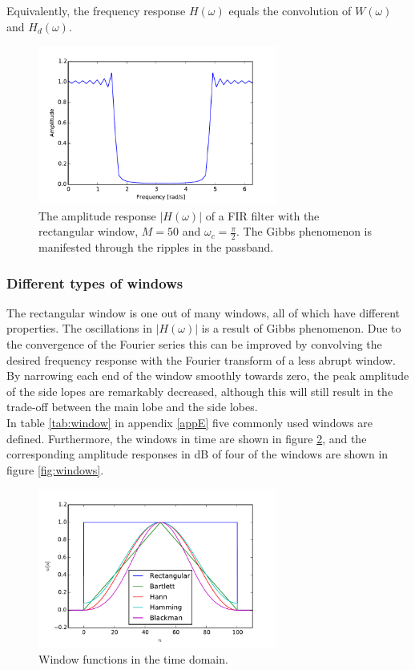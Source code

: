 Equivalently, the frequency response $H(\omega)$ equals the convolution of $W(\omega)$ and $H_d(\omega)$. 

\begin{figure}[H]
\centering
\includegraphics[width=0.7\textwidth]{figures/filter_teori/lowpass_real.pdf}
\caption{The amplitude response $|H(\omega)|$ of a FIR filter with the rectangular window, $M = 50$ and $\omega_c = \frac{\pi}{2}$. The Gibbs phenomenon is manifested through the ripples in the passband.}
\label{fig:lowpass_real}
\end{figure}

\subsubsection{Different types of windows}
The rectangular window is one out of many windows, all of which have different properties. The oscillations in $|H(\omega)|$ is a result of Gibbs phenomenon. Due to the convergence of the Fourier series this can be improved by convolving the desired frequency response with the Fourier transform of a less abrupt window. By narrowing each end of the window smoothly towards zero, the peak amplitude of the side lopes are remarkably decreased, although this will still result in the trade-off between the main lobe and the side lobes. \\
In table \ref{tab:window} in appendix \ref{appE} five commonly used windows are defined. Furthermore, the windows in time are shown in figure \ref{fig:win_type}, and the corresponding amplitude responses in dB of four of the windows are shown in figure \ref{fig:windows}.

\begin{figure}[H]
\centering
\includegraphics[width=0.7\textwidth]{figures/filter_teori/window_types.pdf}
\caption{Window functions in the time domain.}
\label{fig:win_type}
\end{figure}

